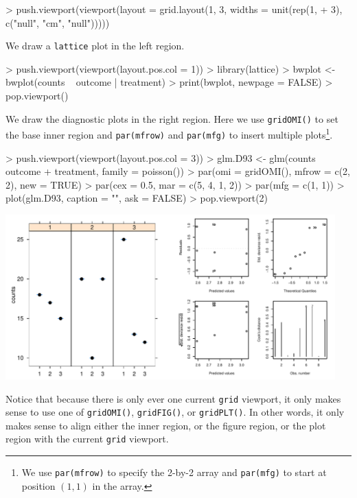\documentclass[a4paper]{article}
\newcommand{\grid}{{\tt grid}}
\newcommand{\lattice}{{\tt lattice}}
\begin{document}
\begin{Schunk}
\begin{Sinput}
> push.viewport(viewport(layout = grid.layout(1, 3, widths = unit(rep(1, 
+     3), c("null", "cm", "null")))))
\end{Sinput}
\end{Schunk}
We draw a \lattice{} plot in the left region.

\begin{Schunk}
\begin{Sinput}
> push.viewport(viewport(layout.pos.col = 1))
> library(lattice)
> bwplot <- bwplot(counts ~ outcome | treatment)
> print(bwplot, newpage = FALSE)
> pop.viewport()
\end{Sinput}
\end{Schunk}
We draw the diagnostic plots in the right region.  Here
we use \verb|gridOMI()| to set the base inner region and
\verb|par(mfrow)| and 
\verb|par(mfg)| to insert multiple plots\footnote{We use
{\tt par(mfrow)} to specify the 2-by-2 array
and {\tt par(mfg)} to start at position $(1,1)$ in the 
array.}.

\begin{Schunk}
\begin{Sinput}
> push.viewport(viewport(layout.pos.col = 3))
> glm.D93 <- glm(counts ~ outcome + treatment, family = poisson())
> par(omi = gridOMI(), mfrow = c(2, 2), new = TRUE)
> par(cex = 0.5, mar = c(5, 4, 1, 2))
> par(mfg = c(1, 1))
> plot(glm.D93, caption = "", ask = FALSE)
> pop.viewport(2)
\end{Sinput}
\end{Schunk}
\includegraphics[width=5in]{gridBase-multiplot}

Notice that because there is only ever one current \grid{} viewport, it only 
makes sense to use one of \verb|gridOMI()|, \verb|gridFIG()|, or
\verb|gridPLT()|.  In other words, it only makes sense to 
align either the inner region, or the figure region, or the plot
region with the current \grid{} viewport.
\end{document}
